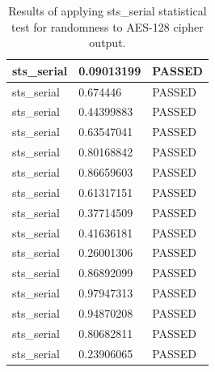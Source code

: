 \documentclass[conference]{IEEEtran}
\begin{document}
\begin{center}
\begin{table}
\begin{tabular}{|l|l|l|}
sts\_serial                            & 0.09013199 & PASSED \\ \hline
sts\_serial                            & 0.674446   & PASSED \\ \hline
sts\_serial                            & 0.44399883 & PASSED \\ \hline
sts\_serial                            & 0.63547041 & PASSED \\ \hline
sts\_serial                            & 0.80168842 & PASSED \\ \hline
sts\_serial                            & 0.86659603 & PASSED \\ \hline
sts\_serial                            & 0.61317151 & PASSED \\ \hline
sts\_serial                            & 0.37714509 & PASSED \\ \hline
sts\_serial                            & 0.41636181 & PASSED \\ \hline
sts\_serial                            & 0.26001306 & PASSED \\ \hline
sts\_serial                            & 0.86892099 & PASSED \\ \hline
sts\_serial                            & 0.97947313 & PASSED \\ \hline
sts\_serial                            & 0.94870208 & PASSED \\ \hline
sts\_serial                            & 0.80682811 & PASSED \\ \hline
sts\_serial                            & 0.23906065 & PASSED \\ \hline
\end{tabular}
\caption{Results of applying sts\_serial statistical test for randomness to AES-128 cipher output.}
\label{dieharderesults1}
\end{table}
\end{center}
\end{document}
